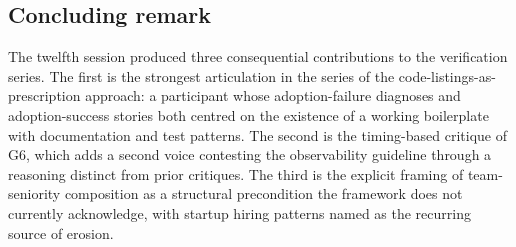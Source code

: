\subsection*{Concluding remark}

The twelfth session produced three consequential contributions to the verification series. The first is the strongest articulation in the series of the code-listings-as-prescription approach: a participant whose adoption-failure diagnoses and adoption-success stories both centred on the existence of a working boilerplate with documentation and test patterns. The second is the timing-based critique of G6, which adds a second voice contesting the observability guideline through a reasoning distinct from prior critiques. The third is the explicit framing of team-seniority composition as a structural precondition the framework does not currently acknowledge, with startup hiring patterns named as the recurring source of erosion.
